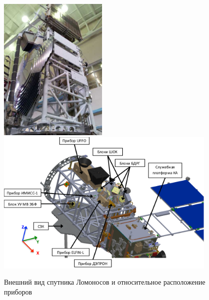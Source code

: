 \begin{figure}
\centering
\includegraphics[height=7cm,keepaspectratio]{images/lomo4}
\includegraphics[height=7cm,keepaspectratio]{images/lomo3}
\caption{Внешний вид спутника Ломоносов и относительное расположение приборов}
\label{fig:lomo3}
\end{figure}


